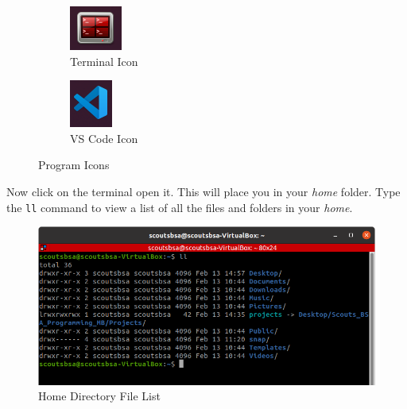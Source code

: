     \begin{figure}[ht]
      \centering
      \begin{subfigure}{0.4\textwidth}
        \centering
        \includegraphics[width=0.5\linewidth]{terminal.png}
        \caption{Terminal Icon}
        \label{fig:terminal_icon}
      \end{subfigure}
      \begin{subfigure}{0.4\textwidth}
        \centering
        \includegraphics[width=0.5\linewidth]{vs_code.png}
        \caption{VS Code Icon}
        \label{fig:vs_code_icon}
      \end{subfigure}
      \caption{Program Icons}
      \label{fig:program_icons}
    \end{figure}

    \FloatBarrier

    Now click on the terminal open it.
    This will place you in your \textit{home} folder.
    Type the \texttt{ll} command to view a list of all the files and folders in your \textit{home}.

    \begin{figure}[ht]
      \centering
      \includegraphics[width=0.8\linewidth]{home_file_list.png}
      \caption{Home Directory File List}
      \label{fig:home_file_list}
    \end{figure}

